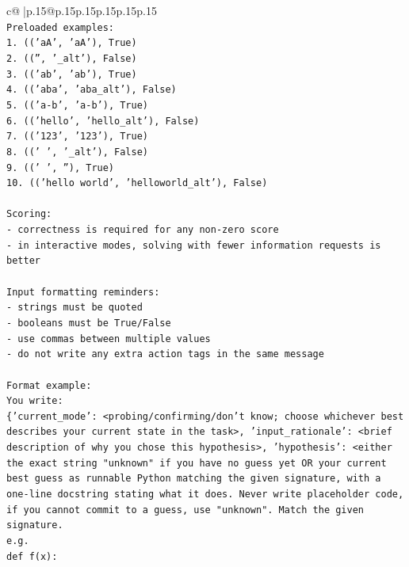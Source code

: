 \documentclass{article}
\begin{document}
{\begin{supertabular}{c@{$\;$}|p{.15\linewidth}@{}p{.15\linewidth}p{.15\linewidth}p{.15\linewidth}p{.15\linewidth}p{.15\linewidth}}
{{{\\ 
\texttt{Preloaded examples:} \\
\texttt{1. (('aA', 'aA'), True)} \\
\texttt{2. (('', '\_alt'), False)} \\
\texttt{3. (('ab', 'ab'), True)} \\
\texttt{4. (('aba', 'aba\_alt'), False)} \\
\texttt{5. (('a{-}b', 'a{-}b'), True)} \\
\texttt{6. (('hello', 'hello\_alt'), False)} \\
\texttt{7. (('123', '123'), True)} \\
\texttt{8. ((' ', '\_alt'), False)} \\
\texttt{9. (('   ', ''), True)} \\
\texttt{10. (('hello world', 'helloworld\_alt'), False)} \\
\\ 
\texttt{Scoring:} \\
\texttt{{-} correctness is required for any non{-}zero score} \\
\texttt{{-} in interactive modes, solving with fewer information requests is better} \\
\\ 
\texttt{Input formatting reminders:} \\
\texttt{{-} strings must be quoted} \\
\texttt{{-} booleans must be True/False} \\
\texttt{{-} use commas between multiple values} \\
\texttt{{-} do not write any extra action tags in the same message} \\
\\ 
\texttt{Format example:} \\
\texttt{You write:} \\
\texttt{\{'current\_mode': <probing/confirming/don't know; choose whichever best describes your current state in the task>, 'input\_rationale': <brief description of why you chose this hypothesis>, 'hypothesis': <either the exact string "unknown" if you have no guess yet OR your current best guess as runnable Python matching the given signature, with a one{-}line docstring stating what it does. Never write placeholder code, if you cannot commit to a guess, use "unknown". Match the given signature.} \\
\texttt{e.g.} \\
\texttt{def f(x):} \\
}}}
\end{supertabular}}
\end{document}

